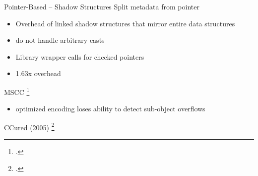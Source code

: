 \documentclass[aspectratio=169]{beamer}
\begin{document}
\begin{frame}{Pointer-Based -- Shadow Structures}
Split metadata from pointer
\begin{itemize}
    \item Overhead of linked shadow structures that mirror entire data structures
    \item do not handle arbitrary casts %
    \item Library wrapper calls for checked pointers %
    \item 1.63x overhead
\end{itemize}
\vspace{0.1in}
MSCC \footcite{xu_efficient_2004}
    \begin{itemize}
     \item optimized encoding loses ability to detect sub-object overflows
    \end{itemize}
\vspace{0.1in}
CCured (2005) \footcite{necula_ccured:_2005} 
\end{frame}

\end{document}
